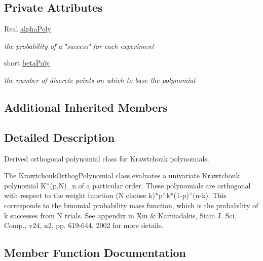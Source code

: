 \subsection*{Private Attributes}
\begin{DoxyCompactItemize}
\item 
Real \hyperlink{classPecos_1_1KrawtchoukOrthogPolynomial_a11666846719189915a02ac6f1f96e393}{alpha\+Poly}\label{classPecos_1_1KrawtchoukOrthogPolynomial_a11666846719189915a02ac6f1f96e393}

\begin{DoxyCompactList}\small\item\em the probability of a \char`\"{}success\char`\"{} for each experiment \end{DoxyCompactList}\item 
short \hyperlink{classPecos_1_1KrawtchoukOrthogPolynomial_af8a06d3cd3f6737b5a9bbc460e4c0d83}{beta\+Poly}\label{classPecos_1_1KrawtchoukOrthogPolynomial_af8a06d3cd3f6737b5a9bbc460e4c0d83}

\begin{DoxyCompactList}\small\item\em the number of discrete points on which to base the polynomial \end{DoxyCompactList}\end{DoxyCompactItemize}
\subsection*{Additional Inherited Members}


\subsection{Detailed Description}
Derived orthogonal polynomial class for Krawtchouk polynomials. 

The \hyperlink{classPecos_1_1KrawtchoukOrthogPolynomial}{Krawtchouk\+Orthog\+Polynomial} class evaluates a univariate Krawtchouk polynomial K$^\wedge$(p,N)\+\_\+n of a particular order. These polynomials are orthogonal with respect to the weight function (N choose k)$\ast$p$^\wedge$k$\ast$(1-\/p)$^\wedge$(n-\/k). This corresponds to the binomial probability mass function, which is the probability of k successes from N trials. See appendix in Xiu \& Karniadakis, Siam J. Sci. Comp., v24, n2, pp. 619-\/644, 2002 for more details. 

\subsection{Member Function Documentation}
